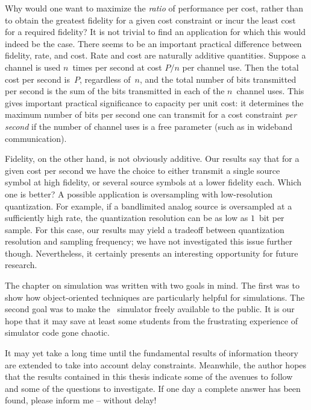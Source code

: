 Why would one want to maximize the \emph{ratio} of performance per cost, rather
than to obtain the greatest fidelity for a given cost constraint or incur the
least cost for a required fidelity? It is not trivial to find an application for
which this would indeed be the case. There seems to be an important practical
difference between fidelity, rate, and cost. Rate and cost are naturally
additive quantities. Suppose a channel is used $n$~times per second at cost
$P/n$ per channel use. Then the total cost per second is~$P$, regardless of~$n$,
and the total number of bits transmitted per second is the sum of the bits
transmitted in each of the $n$~channel uses. This gives important practical
significance to capacity per unit cost: it determines the maximum number of bits
per second one can transmit for a cost constraint \emph{per second} if the
number of channel uses is a free parameter (such as in wideband communication). 

Fidelity, on the other hand, is not obviously additive. Our results say that for
a given cost per second we have the choice to either transmit a single source
symbol at high fidelity, or several source symbols at a lower fidelity each.
Which one is better? A possible application is oversampling with low-resolution
quantization. For example, if a bandlimited analog source is oversampled at a
sufficiently high rate, the quantization resolution can be as low as $1$~bit
per sample. For this case, our results may yield a tradeoff between quantization
resolution and sampling frequency; we have not investigated this issue further
though. Nevertheless, it certainly presents an interesting opportunity for
future research. 

\medbreak

The chapter on simulation was written with two goals in mind. The first was to
show how object-oriented techniques are particularly helpful for simulations.
The second goal was to make the \jscsim\ simulator freely available to the
public. It is our hope that it may save at least some students from the
frustrating experience of simulator code gone chaotic. 

\medbreak

It may yet take a long time until the fundamental results of information theory
are extended to take into account delay constraints. Meanwhile, the author hopes
that the results contained in this thesis indicate some of the avenues to follow
and some of the questions to investigate. If one day a complete answer has been
found, please inform me -- without delay!
